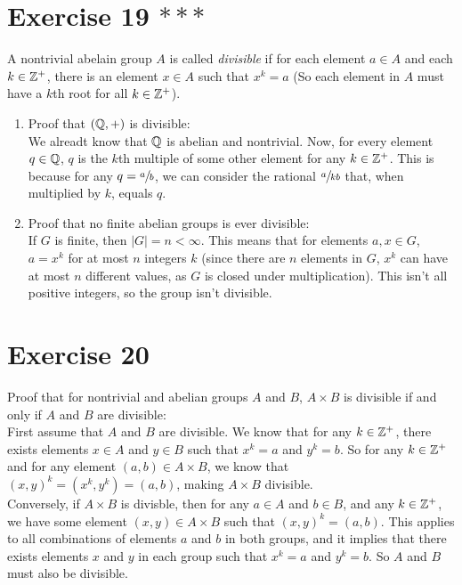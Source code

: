 \documentclass[12pt]{article}
\begin{document}
    \section*{Exercise 19 $***$}
    A nontrivial abelain group $A$ is called \textit{divisible}
    if for each element $a \in A$ and each $k \in \mathbb{Z}^+$,
    there is an element $x \in A$ such that $x^k = a$
    (So each element in $A$ must have a $k$th root for all $k \in \mathbb{Z}^+$).
    \begin{enumerate}[label=\textbf{\alph*.}]
        \item
            Proof that $(\mathbb{Q}, +)$ is divisible: \\
            We alreadt know that $\mathbb{Q}$ is abelian and nontrivial.
            Now, for every element $q \in \mathbb{Q}$,
            $q$ is the $k$th multiple of some other element 
            for any $k \in \mathbb{Z}^+$.
            This is because for any $q = \sfrac{a}{b}$,
            we can consider the rational $\sfrac{a}{kb}$
            that, when multiplied by $k$,
            equals $q$.
        \item
            Proof that no finite abelian groups is ever divisible: \\
            If $G$ is finite,
            then $|G| = n < \infty$.
            This means that for elements $a, x \in G$,
            $a = x^k$ for at most $n$ integers $k$
            (since there are $n$ elements in $G$,
            $x^k$ can have at most $n$ different values,
            as $G$ is closed under multiplication).
            This isn't all positive integers,
            so the group isn't divisible.
    \end{enumerate}


    \section*{Exercise 20}
    Proof that for nontrivial and abelian groups $A$ and $B$,
    $A \times B$ is divisible if and only if $A$ and $B$ are divisible: \\
    First assume that $A$ and $B$ are divisible.
    We know that for any $k \in \mathbb{Z}^+$,
    there exists elements $x \in A$ and $y \in B$
    such that $x^k = a$ and $y^k = b$.
    So for any $k \in \mathbb{Z}^+$ and for any element $(a, b) \in A \times B$,
    we know that $(x, y)^k = (x^k, y^k) = (a, b)$,
    making $A \times B$ divisible. \\
    Conversely, if $A \times B$ is divisble,
    then for any $a \in A$ and $b \in B$,
    and any $k \in \mathbb{Z}^+$,
    we have some element $(x, y) \in A \times B$
    such that $(x, y)^k = (a, b)$.
    This applies to all combinations of elements $a$ and $b$
    in both groups,
    and it implies that there exists elements $x$ and $y$
    in each group such that $x^k = a$ and $y^k = b$.
    So $A$ and $B$ must also be divisible.

    
\end{document}
